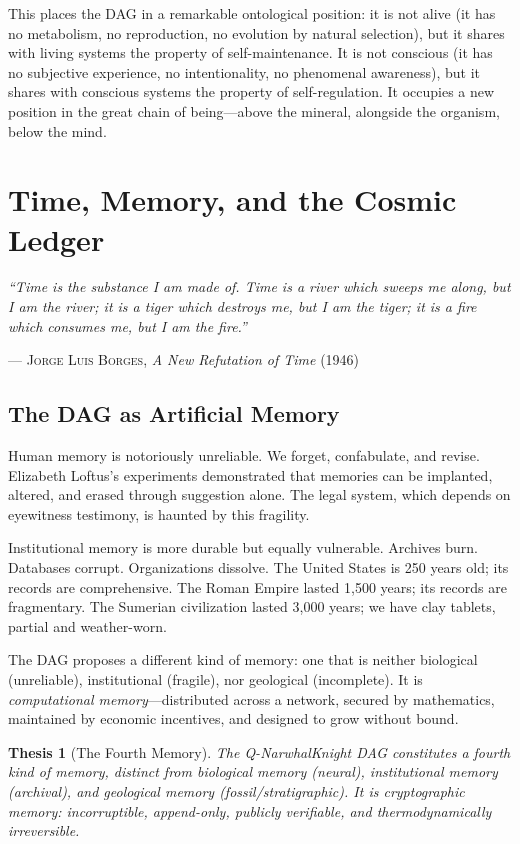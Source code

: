 \documentclass[12pt,a4paper]{article}
\theoremstyle{philosophical}
\newtheorem{thesis}{Thesis}
\begin{document}
This places the DAG in a remarkable ontological position: it is not alive (it has no metabolism, no reproduction, no evolution by natural selection), but it shares with living systems the property of self-maintenance. It is not conscious (it has no subjective experience, no intentionality, no phenomenal awareness), but it shares with conscious systems the property of self-regulation. It occupies a new position in the great chain of being---above the mineral, alongside the organism, below the mind.

\section{Time, Memory, and the Cosmic Ledger}

\epigraph{\textit{``Time is the substance I am made of. Time is a river which sweeps me along, but I am the river; it is a tiger which destroys me, but I am the tiger; it is a fire which consumes me, but I am the fire.''}}{\textsc{--- Jorge Luis Borges}, \textit{A New Refutation of Time} (1946)}

\subsection{The DAG as Artificial Memory}

Human memory is notoriously unreliable. We forget, confabulate, and revise. Elizabeth Loftus's experiments demonstrated that memories can be implanted, altered, and erased through suggestion alone. The legal system, which depends on eyewitness testimony, is haunted by this fragility.

Institutional memory is more durable but equally vulnerable. Archives burn. Databases corrupt. Organizations dissolve. The United States is 250 years old; its records are comprehensive. The Roman Empire lasted 1,500 years; its records are fragmentary. The Sumerian civilization lasted 3,000 years; we have clay tablets, partial and weather-worn.

The DAG proposes a different kind of memory: one that is neither biological (unreliable), institutional (fragile), nor geological (incomplete). It is \emph{computational memory}---distributed across a network, secured by mathematics, maintained by economic incentives, and designed to grow without bound.

\begin{thesis}[The Fourth Memory]
\label{thesis:memory}
The Q-NarwhalKnight DAG constitutes a fourth kind of memory, distinct from biological memory (neural), institutional memory (archival), and geological memory (fossil/stratigraphic). It is \emph{cryptographic memory}: incorruptible, append-only, publicly verifiable, and thermodynamically irreversible.
\end{thesis}
\end{document}
